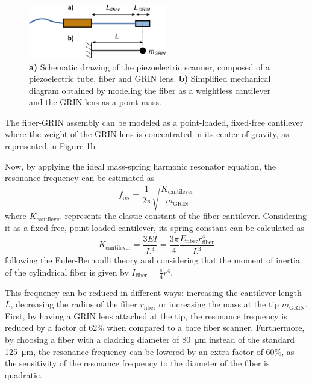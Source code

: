 \documentclass[10pt]{iopart}
\begin{document}
\begin{figure}[h!]\centering
      \includegraphics[width=6cm]{figures/EB.pdf}
      \caption{\textbf{a)} Schematic drawing of the piezoelectric scanner, composed of a piezoelectric tube, fiber and GRIN lens. 
      \textbf{b)} Simplified mechanical diagram obtained by modeling the fiber as a weightless cantilever and the GRIN lens as a point mass.}
      \label{fig:EB}
\end{figure}

The fiber-GRIN assembly can be modeled as a point-loaded, fixed-free cantilever where the weight of the GRIN lens is concentrated in its center of gravity, as represented in Figure \ref{fig:EB}b. 

Now, by applying the ideal mass-spring harmonic resonator equation, the resonance frequency can be estimated as 
\begin{equation}
f_\mathrm{res} = \frac{1}{2 \pi} \sqrt{\frac{K_\mathrm{cantilever}}{m_{\mathrm{GRIN}}}} 
\label{eq:fres}
\end{equation}
where $K_\mathrm{cantilever}$ represents the elastic constant of the fiber cantilever. Considering it as a fixed-free, point loaded cantilever, its spring constant can be calculated as 
\begin{equation}
K_\mathrm{cantilever} = \frac{3 E I}{L^3} = \frac{3 \pi}{4} \frac{E_\mathrm{fiber} r_\mathrm{fiber}^4}{L^3}
\label{eq:EB}
\end{equation}
following the Euler-Bernoulli theory \cite{MarcJ.Madou2011} and considering that the moment of inertia of the cylindrical fiber is given by $I_\mathrm{fiber} = \frac{\pi}{4} r^4$. 

This frequency can be reduced in different ways: increasing the cantilever length $L$, decreasing the radius of the fiber $r_\mathrm{fiber}$ or increasing the mass at the tip $m_{\mathrm{GRIN}}$. First, by having a GRIN lens attached at the tip, the resonance frequency is reduced by a factor of 62\% when compared to a bare fiber scanner. Furthermore, by choosing a fiber with a cladding diameter of \SI{80}{\micro\meter} instead of the standard \SI{125}{\micro\meter}, the resonance frequency can be lowered by an extra factor of 60\%, as the sensitivity of the resonance frequency to the diameter of the fiber is quadratic. 
\end{document}

